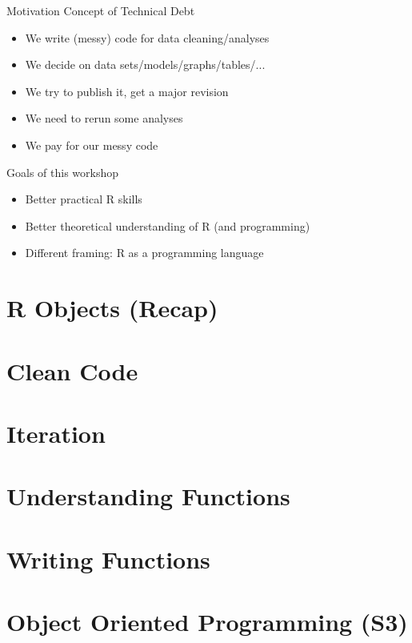 \documentclass[xcolor=table]{beamer}\usepackage[]{graphicx}\usepackage[]{color}
\begin{document}
\begin{frame}{Motivation}
Concept of Technical Debt
\begin{itemize}
  \item We write (messy) code for data cleaning/analyses
  \item We decide on data sets/models/graphs/tables/...
  \item We try to publish it, get a major revision
  \item We need to rerun some analyses
  \item We pay for our messy code
\end{itemize}
\end{frame}

\begin{frame}{Goals of this workshop}
\begin{itemize}
  \item Better practical R skills
  \item Better theoretical understanding of R (and programming)
  \item Different framing: R as a programming language
\end{itemize}
\end{frame}


\section{R Objects (Recap)}

\section{Clean Code}

\section{Iteration}

\section{Understanding Functions}

\section{Writing Functions}

\section{Object Oriented Programming (S3)}
\end{document}
